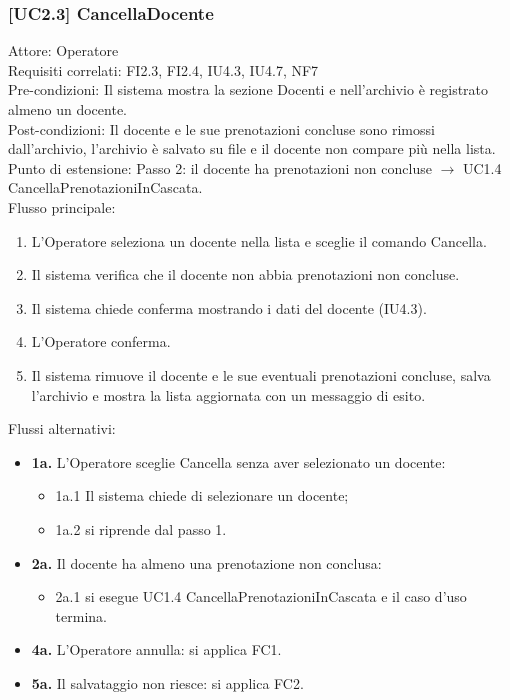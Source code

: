 \subsubsection{[UC2.3] CancellaDocente}
\noindent Attore: Operatore\\
Requisiti correlati: FI2.3, FI2.4, IU4.3, IU4.7, NF7\\
Pre-condizioni: Il sistema mostra la sezione Docenti e nell'archivio è registrato almeno un docente.\\
Post-condizioni: Il docente e le sue prenotazioni concluse sono rimossi dall'archivio, l'archivio è salvato su file e il docente non compare più nella lista.\\
Punto di estensione: Passo 2: il docente ha prenotazioni non concluse $\rightarrow$ UC1.4 CancellaPrenotazioniInCascata.\\

\noindent Flusso principale:
\begin{enumerate}
\item L'Operatore seleziona un docente nella lista e sceglie il comando Cancella.
\item Il sistema verifica che il docente non abbia prenotazioni non concluse.
\item Il sistema chiede conferma mostrando i dati del docente (IU4.3).
\item L'Operatore conferma.
\item Il sistema rimuove il docente e le sue eventuali prenotazioni concluse, salva l'archivio e mostra la lista aggiornata con un messaggio di esito.
\end{enumerate}
\noindent Flussi alternativi:
\begin{itemize}
\item \textbf{1a.} L'Operatore sceglie Cancella senza aver selezionato un docente:
\begin{itemize}
\item 1a.1 Il sistema chiede di selezionare un docente;
\item 1a.2 si riprende dal passo 1.
\end{itemize}
\item \textbf{2a.} Il docente ha almeno una prenotazione non conclusa:
\begin{itemize}
\item 2a.1 si esegue UC1.4 CancellaPrenotazioniInCascata e il caso d'uso termina.
\end{itemize}
\item \textbf{4a.} L'Operatore annulla: si applica FC1.
\item \textbf{5a.} Il salvataggio non riesce: si applica FC2.
\end{itemize}

